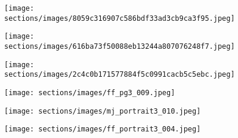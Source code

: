 \begin{figure*}[h!]
\centering
\captionsetup{justification=raggedright, singlelinecheck=false, skip=2pt, font=small}

\begin{subfigure}[t]{0.27\linewidth}
\centering
    \subcaption{}
    \texttt{[image: sections/images/8059c316907c586bdf33ad3cb9ca3f95.jpeg]}
\end{subfigure}
\hspace{1cm}
\begin{subfigure}[t]{0.27\linewidth}
\centering
    \subcaption{}
    \texttt{[image: sections/images/616ba73f50088eb13244a807076248f7.jpeg]}
\end{subfigure}
\hspace{1cm}
\begin{subfigure}[t]{0.27\linewidth}
\centering
    \subcaption{}
    \texttt{[image: sections/images/2c4c0b171577884f5c0991cacb5c5ebc.jpeg]}
\end{subfigure}

\vskip 5mm %

\begin{subfigure}[t]{0.27\linewidth}
\centering
    \subcaption{}
    \texttt{[image: sections/images/ff\_pg3\_009.jpeg]}
\end{subfigure}
\hspace{1cm}
\begin{subfigure}[t]{0.27\linewidth}
\centering
    \subcaption{}
    \texttt{[image: sections/images/mj\_portrait3\_010.jpeg]}
\end{subfigure}
\hspace{1cm}
\begin{subfigure}[t]{0.27\linewidth}
\centering
    \subcaption{}
    \texttt{[image: sections/images/ff\_portrait3\_004.jpeg]}
\end{subfigure}


\end{figure*}
